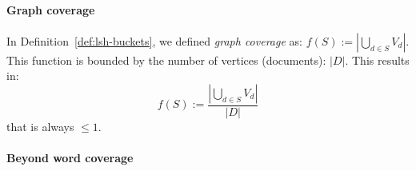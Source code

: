 \paragraph{Graph coverage}
In Definition~\vref{def:lsh-buckets}, we defined \emph{graph coverage} as:
\(f(S) := |\bigcup_{d \in S} V_d|\).
This function is bounded by the number of vertices (documents): \(|D|\). This
results in:
\[
  f(S) := \frac{|\bigcup_{d \in S} V_d|}{|D|}
\]
that is always \(\leq 1\).

\paragraph{Beyond word coverage} 

